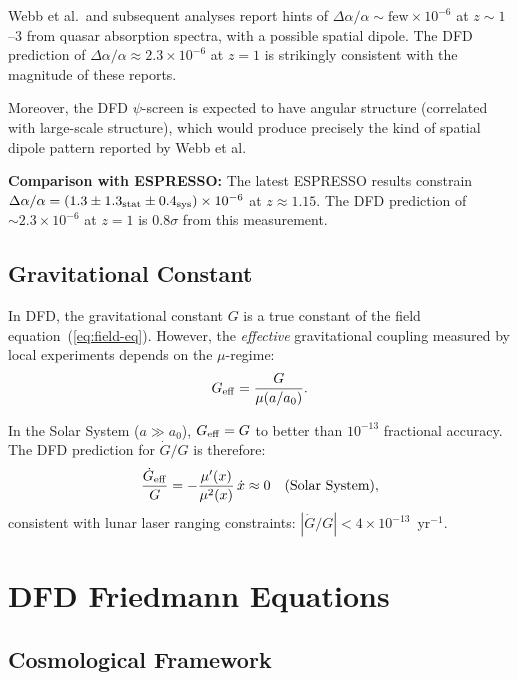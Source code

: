 \documentclass[aps,prd,twocolumn,superscriptaddress,nofootinbib]{revtex4-2}
\begin{document}
Webb et al.\ and subsequent analyses report hints of
$\Delta\alpha/\alpha \sim \text{few}\times 10^{-6}$ at
$z \sim 1$--$3$ from quasar absorption spectra, with a possible
spatial dipole. The DFD prediction of
$\Delta\alpha/\alpha \approx 2.3\times 10^{-6}$ at $z = 1$ is
strikingly consistent with the magnitude of these reports.

Moreover, the DFD $\psi$-screen is expected to have angular
structure (correlated with large-scale structure), which would
produce precisely the kind of spatial dipole pattern reported
by Webb et al.

\textbf{Comparison with ESPRESSO:} The latest ESPRESSO results
constrain $\Delta\alpha/\alpha = (1.3 \pm 1.3_{\rm stat} \pm
0.4_{\rm sys})\times 10^{-6}$ at $z \approx 1.15$. The DFD
prediction of $\sim 2.3\times 10^{-6}$ at $z = 1$ is $0.8\sigma$
from this measurement.

\subsection{Gravitational Constant}\label{sec:dG-dt}

In DFD, the gravitational constant $G$ is a true constant of the
field equation~(\ref{eq:field-eq}). However, the \textit{effective}
gravitational coupling measured by local experiments depends on the
$\mu$-regime:
\begin{equation}
G_{\rm eff} = \frac{G}{\mu(a/a_0)}.
\end{equation}

In the Solar System ($a \gg a_0$), $G_{\rm eff} = G$ to better
than $10^{-13}$ fractional accuracy. The DFD prediction for
$\dot{G}/G$ is therefore:
\begin{equation}
\frac{\dot{G}_{\rm eff}}{G} = -\frac{\mu'(x)}{\mu^2(x)}\,\dot{x}
\approx 0 \quad\text{(Solar System)},
\end{equation}
consistent with lunar laser ranging constraints:
$|\dot{G}/G| < 4\times 10^{-13}$~yr$^{-1}$.

\section{DFD Friedmann Equations}\label{sec:friedmann}

\subsection{Cosmological Framework}
\end{document}
